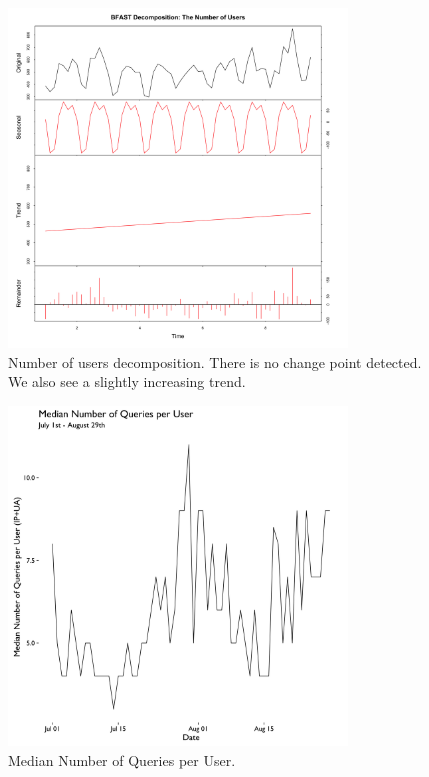 \documentclass[12pt,]{article}
\begin{document}
\begin{figure}[H]
\centering
\includegraphics[width=9cm,height=9cm,keepaspectratio]{figures/user_decompose.png}
\caption{Number of users decomposition. There is no change point
detected. We also see a slightly increasing trend.}
\end{figure}

\begin{figure}[H]
\centering
\includegraphics[width=9cm,height=9cm,keepaspectratio]{figures/md_query_per_user_ts.png}
\caption{Median Number of Queries per User.}
\end{figure}
\end{document}
